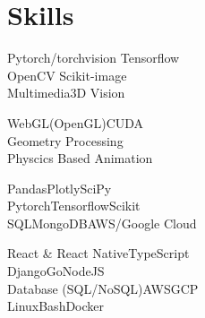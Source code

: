 \documentclass[letterpaper]{deedy-resume} %
\begin{document}




\begin{minipage}[t]{0.33\textwidth} %



\section{Skills}

Pytorch/torchvision \textbullet{} Tensorflow \\
OpenCV\textbullet{} Scikit-image\\
Multimedia\textbullet{}3D Vision\\
\subsectionspace

WebGL(OpenGL)\textbullet{}CUDA\\
Geometry Processing\textbullet\\
Physcics Based Animation\\
\subsectionspace

Pandas\textbullet{}Plotly\textbullet{}SciPy\textbullet{}\\
Pytorch\textbullet{}Tensorflow\textbullet{}Scikit\\
SQL\textbullet{}MongoDB\textbullet{}AWS/Google Cloud\\
\subsectionspace

React \& React Native\textbullet{}TypeScript\\
Django\textbullet{}Go\textbullet{}NodeJS\\
Database (SQL/NoSQL)\textbullet{}AWS\textbullet{}GCP\\
Linux\textbullet{}Bash\textbullet{}Docker
\subsectionspace


\end{minipage}
\end{document}
